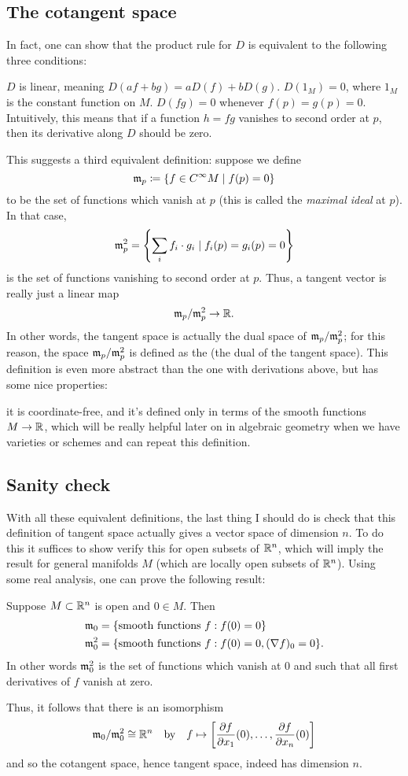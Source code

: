 \subsection{The cotangent space}
In fact, one can show that the product rule
for $D$ is equivalent to the following three conditions:
\begin{enumerate}
	\ii $D$ is linear, meaning $D(af+bg) = a D(f) + b D(g)$.
	\ii $D(1_M) = 0$, where $1_M$ is the constant function on $M$.
	\ii $D(fg) = 0$ whenever $f(p) = g(p) = 0$.
	Intuitively, this means that if a function $h = fg$
	vanishes to second order at $p$,
	then its derivative along $D$ should be zero.
\end{enumerate}

This suggests a third equivalent definition:
suppose we define
\[ \mathfrak m_p \coloneqq \left\{ f \in C^\infty M \mid f(p) = 0 \right\} \]
to be the set of functions which vanish at $p$
(this is called the \emph{maximal ideal} at $p$).
In that case,
\[ \mathfrak m_p^2 = \left\{ \sum_i f_i \cdot g_i
	\mid f_i(p) = g_i(p) = 0 \right\} \]
is the set of functions vanishing to second order at $p$.
Thus, a tangent vector is really just a linear map
\[ \mathfrak m_p / \mathfrak m_p^2 \to \mathbb R. \]
In other words, the tangent space is actually the
dual space of $\mathfrak m_p / \mathfrak m_p^2$;
for this reason, the space $\mathfrak m_p / \mathfrak m_p^2$ is defined as the
 (the dual of the tangent space).
This definition is even more abstract than the one with derivations above,
but has some nice properties:
\begin{itemize}
	\ii it is coordinate-free, and
	\ii it's defined only in terms of the smooth functions $M \to \mathbb R$,
	which will be really helpful later on in algebraic geometry
	when we have varieties or schemes and can repeat this definition.
\end{itemize}

\subsection{Sanity check}
With all these equivalent definitions, the last thing I should do is check that
this definition of tangent space actually gives a vector space of dimension $n$.
To do this it suffices to show verify this for open subsets of $\mathbb R^n$,
which will imply the result for general manifolds $M$
(which are locally open subsets of $\mathbb R^n$).
Using some real analysis, one can prove the following result:
\begin{theorem}
	Suppose $M \subset \mathbb R^n$ is open and $0 \in M$.
	Then
	\[
	\begin{aligned}
		\mathfrak m_0 &= \{ \text{smooth functions } f : f(0) = 0 \} \\
		\mathfrak m_0^2 &= \{ \text{smooth functions } f : f(0) = 0, (\nabla f)_0 = 0 \}.
	\end{aligned}
	\]
	In other words $\mathfrak m_0^2$ is the set of functions which vanish at $0$
	and such that all first derivatives of $f$ vanish at zero.
\end{theorem}
Thus, it follows that there is an isomorphism
\[ \mathfrak m_0 / \mathfrak m_0^2 \cong \mathbb R^n
	\quad\text{by}\quad
	f \mapsto
	\left[ \frac{\partial f}{\partial x_1}(0),
		\dots, \frac{\partial f}{\partial x_n}(0) \right] \]
and so the cotangent space, hence tangent space,
indeed has dimension $n$.

